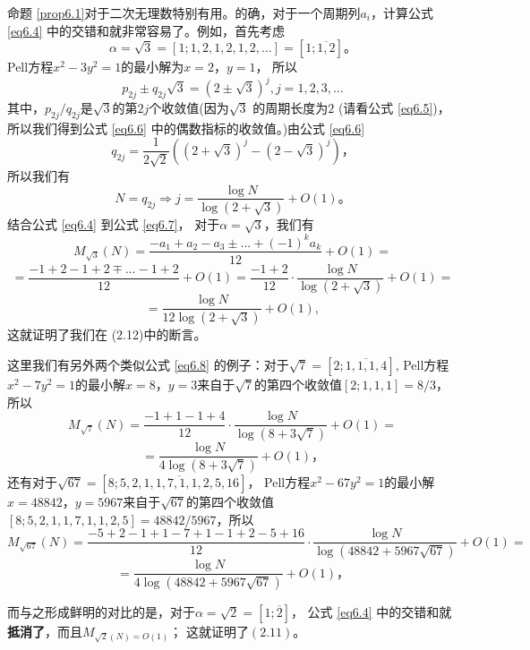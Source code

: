 \documentclass[11pt,a4paper]{article}
\theoremstyle{definition}
\newcommand{\refeq}[1]{公式 \ref{#1}}
\newcommand{\refprop}[1]{命题 \ref{#1}}
\numberwithin{equation}{section}
\newcommand{\comma}{\text{，}}
\newcommand{\juhao}{\text{。}}
\newcommand{\xysolution}[2]{$ x=#1\comma y=#2 $}
\begin{document}
\refprop{prop6.1}对于二次无理数特别有用。的确，对于一个周期列$ a_{i} $，计算\refeq{eq6.4} 中的交错和就非常容易了。例如，首先考虑
\begin{equation}\label{eq6.5}
	\alpha=\sqrt{3}=\left[1;1,2,1,2,1,2,\ldots\right]=\left[1;\overline{1,2}\right]\juhao
\end{equation}
Pell方程$ x^{2}-3y^{2}=1 $的最小解为\xysolution{2}{1}， 所以
\begin{equation}\label{eq6.6}
	p_{2j}\pm q_{2j}\sqrt{3}={\left(2\pm \sqrt{3}\right)}^{j}, j=1,2,3,\ldots
\end{equation}
其中，$ p_{2j}/q_{2j} $是$ \sqrt{3} $的第$ 2j $个收敛值(因为$ \sqrt{3} $ 的周期长度为$ 2 $ (请看\refeq{eq6.5})，所以我们得到\refeq{eq6.6} 中的偶数指标的收敛值。)由\refeq{eq6.6}
\[ q_{2j}=\dfrac{1}{2\sqrt{2}}\left({\left(2+\sqrt{3}\right)}^{j}-{\left(2-\sqrt{3}\right)}^{j}\right)\comma \]
所以我们有
\begin{equation}\label{eq6.7}
	N=q_{2j}\Rightarrow j=\dfrac{\log N}{\log\left(2+\sqrt{3}\right)}+O\left(1\right)\juhao
\end{equation}
结合\refeq{eq6.4} 到\refeq{eq6.7}， 对于$ \alpha=\sqrt{3} $，我们有
\[ M_{\sqrt{3}}\left(N\right)=\dfrac{-a_{1}+a_{2}-a_{3}\pm\ldots+{\left(-1\right)}^{k}a_{k}}{12}+O\left(1\right)= \]
\[ =\dfrac{-1+2-1+2\mp\ldots-1+2}{12}+O\left(1\right)=\dfrac{-1+2}{12}\cdot\dfrac{\log N}{\log\left(2+\sqrt{3}\right)}+O\left(1\right)= \]
\begin{equation}\label{eq6.8}	
=\dfrac{\log N}{12\log\left(2+\sqrt{3}\right)}+O\left(1\right),
\end{equation}这就证明了我们在 (2.12)中的断言。

这里我们有另外两个类似\refeq{eq6.8} 的例子：对于$ \sqrt{7}=\left[2;\overline{1,1,1,4}\right] $, Pell方程$x^{2}-7y^{2}=1  $的最小解$ x=8\comma y=3 $来自于$ \sqrt{7} $的第四个收敛值$ \left[2;1,1,1\right]=8/3 $，所以
\[
M_{\sqrt{7}}\left(N\right)=\dfrac{-1+1-1+4}{12}\cdot\dfrac{\log N}{\log\left(8+3\sqrt{7}\right)}+O\left(1\right)=\]
\[=\dfrac{\log N}{4\log\left(8+3\sqrt{7}\right)}+O\left(1\right)\comma
  \]
还有对于$ \sqrt{67}=\left[8;\overline{5,2,1,1,7,1,1,2,5,16}\right] $， Pell方程$x^{2}-67y^{2}=1  $的最小解\xysolution{48842}{5967}来自于$ \sqrt{67} $的第四个收敛值$ \left[8;5,2,1,1,7,1,1,2,5\right]=48842/5967 $，所以
\[
M_{\sqrt{67}}\left(N\right)=\dfrac{-5+2-1+1-7+1-1+2-5+16}{12}\cdot\dfrac{\log N}{\log\left(48842+5967\sqrt{67}\right)}+O\left(1\right)=\]
\[=\dfrac{\log N}{4\log\left(48842+5967\sqrt{67}\right)}+O\left(1\right)\comma
\]

而与之形成鲜明的对比的是，对于$ \alpha=\sqrt{2}=\left[1;\overline{2}\right] $， \refeq{eq6.4} 中的交错和就\textbf{抵消了}，而且$ M_{\sqrt{2}\left(N\right)=O\left(1\right)} $； 这就证明了$ \left(2.11\right) $。
\end{document}
